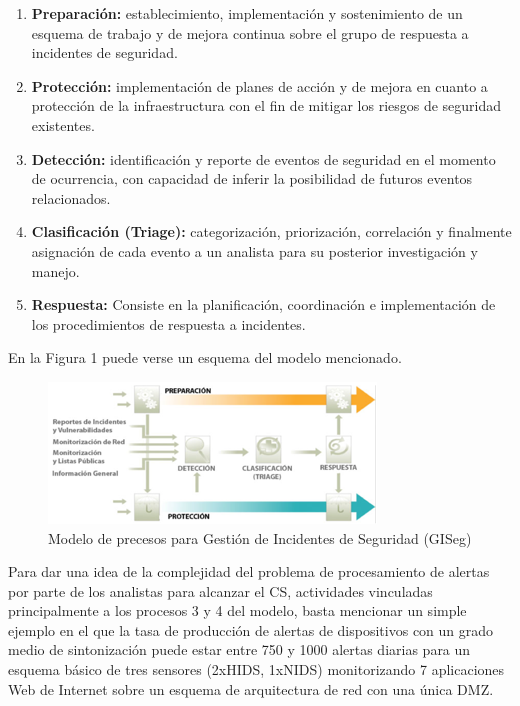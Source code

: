 \documentclass[a4paper]{./plantillas/llncs}
\begin{document}
\begin{enumerate}
\item {\bfseries Preparación:} establecimiento, implementación y sostenimiento de un esquema de trabajo y de mejora continua sobre el grupo de respuesta a incidentes de seguridad.
\item {\bfseries Protección:} implementación de planes de acción y de mejora en cuanto a protección de la infraestructura con el fin de mitigar los riesgos de seguridad existentes.
\item {\bfseries Detección:} identificación y reporte de eventos de seguridad en el momento de ocurrencia, con capacidad de inferir la posibilidad de futuros eventos relacionados.
\item {\bfseries Clasificación (Triage):} categorización, priorización, correlación y finalmente asignación de cada evento a un analista para su posterior investigación y manejo.
\item {\bfseries Respuesta:} Consiste en la planificación, coordinación e implementación de los procedimientos de respuesta a incidentes.
\end{enumerate}



En la Figura 1 puede verse un esquema del modelo mencionado. \newline

\begin{figure}
\centering
\includegraphics[scale=0.4]{./img/1-gis}
\caption{Modelo de precesos para Gestión de Incidentes de Seguridad (GISeg)}
\end{figure}


Para dar una idea de la complejidad del problema de procesamiento de alertas por parte de los analistas para alcanzar el CS, actividades vinculadas principalmente a los procesos 3 y 4 del modelo, basta mencionar un simple ejemplo en el que la tasa de producción de alertas de dispositivos con un grado medio de sintonización puede estar entre 750 y 1000 alertas diarias para un esquema básico de tres sensores (2xHIDS, 1xNIDS) monitorizando 7 aplicaciones Web de Internet sobre un esquema de arquitectura de red con una única DMZ.
\end{document}
